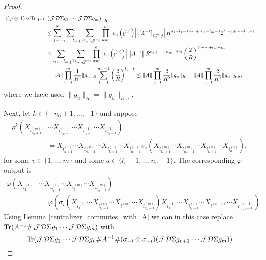 \begin{proof}
	\begin{align*}
		\left\| (\varphi\otimes 1)\circ\text{Tr}_{A^{-1}}\right.&\left.(\operatorname{\mathcal J}\mathcal D\Sigma g_1\cdots \operatorname{\mathcal J}\mathcal D\Sigma g_m)\right\|_R \\
				&\leq \sum_{j=1}^N \sum_{l_1,\ldots,l_m} \sum_{\underline{i}^{(1)},\ldots, \underline{i}^{(m)}} \prod_{u=1}^m \left|c_u\left(\underline{i}^{(u)}\right)\right| \left|[A^{-1}]_{i_m^{(m)} j}\right| R^{n_1-l_1-1+\cdots +n_m-l_m-1} 2^{l_1-1+\cdots +l_m-1}\\
				&\leq \sum_{l_1,\ldots,l_m} \sum_{\underline{i}^{(1)},\ldots, \underline{i}^{(m)}} \prod_{u=1}^m \left|c_u\left(\underline{i}^{(u)}\right)\right| \left\|A^{-1}\right\| R^{n_1+\cdots +n_m - 2m} \left(\frac{2}{R}\right)^{l_1+\cdots +l_m-m}\\
				&=\|A\| \prod_{u=1}^m \frac{1}{R^2}\| g_u\|_R \sum_{l_u=1}^{n_m-1} \left(\frac{2}{R}\right)^{l_u-1} \leq \|A\| \prod_{u=1}^m \frac{2}{R^2}\|g_u\|_R=\|A\| \prod_{u=1}^m \frac{2}{R^2}\|g_u\|_{R,\sigma},
	\end{align*}
where we have used $\|g_u\|_R=\|g_u\|_{R,\sigma}$.\par
Next, let $k\in\{ -n_0+1,\ldots, -1\}$ and suppose
	\begin{align*}
		\rho^k\left( X_{i_{l_{m}+1}^{(m)}}\right. &\cdots \left.X_{i_{n_m-1}^{(m)}}\cdots X_{i_{l_1+1}^{(1)}} \cdots X_{i_{n_1-1}^{(1)}}\right)\\
			&=X_{i_{a+1}^{(v)}}\cdots X_{i_{n_v-1}^{(v)}} \cdots X_{i_{l_1+1}^{(1)}} \cdots X_{i_{n_1-1}^{(1)}}\sigma_i\left( X_{i_{l_m+1}^{(m)}}\cdots X_{i_{n_m-1}^{(m)}} \cdots X_{i_{l_v+1}^{(v)}}\cdots X_{i_a^{(v)}}\right),
	\end{align*}
for some $v\in \{1,\ldots,m\}$ and some $a\in\{l_v+1,\ldots ,n_v-1\}$. The corresponding $\varphi$ output is
	\begin{align*}
		\varphi\left( X_{i_1^{(1)}}\right.& \left.\cdots X_{i_{l_1-1}^{(1)}}\cdots X_{i_1^{(m)}}\cdots X_{i_{l_m-1}^{(m)}}\right)\\
				&=\varphi\left( \sigma_i\left( X_{i_1^{(v)}}\cdots X_{i_{l_v -1}^{(v)}} \cdots X_{i_1^{(m)}}\cdots X_{i_{l_m-1}^{(m)}}\right) X_{i_1^{(1)}}\cdots X_{i_{l_1-1}^{(1)}} \cdots X_{i_1^{(v-1)}}\cdots X_{i_{l_{v-1}-1}^{(v-1)}}\right).
	\end{align*}
Using Lemma \ref{centralizer_commutes_with_A} we can in this case replace $\text{Tr}(A^{-1}\# \operatorname{\mathcal J}\mathcal D\Sigma g_1\cdots \operatorname{\mathcal J}\mathcal D\Sigma g_m)$ with
	\begin{equation*}
		\text{Tr}(\J\D\Sigma g_1 \cdots \J\D\Sigma g_v\#A^{-1}\#(\sigma_{-i}\otimes\sigma_{-i})(\J\D\Sigma g_{v+1}\cdots \J\D\Sigma g_m))

\end{equation*}
\end{proof}
